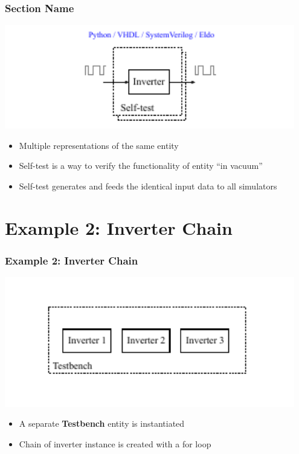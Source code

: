 \documentclass{sdkslides}
\newcommand{\sectname}{Section Name}
\begin{document}
\begin{frame}[t]
    \frametitle{\sectname}
    \centering
    \includegraphics[width=0.95\textwidth]{Pics/inverter_single_2}
    \begin{itemize}
        \item Multiple representations of the same entity
        \item Self-test is a way to verify the functionality of entity ``in
            vacuum''
        \item Self-test generates and feeds the identical input
            data to all simulators
    \end{itemize}
\end{frame}

\renewcommand{\sectname}{Example 2: Inverter Chain}
\section{\sectname}
\begin{frame}[t]
    \frametitle{\sectname}
    \centering
    \includegraphics[width=0.95\textwidth]{Pics/inverter_chain_0}
    \begin{itemize}
        \item A separate \textbf{Testbench} entity is instantiated
        \item Chain of inverter instance is created with a for loop
    \end{itemize}
\end{frame}
\end{document}
